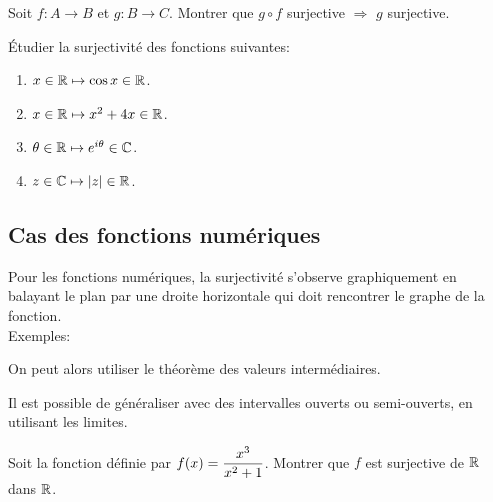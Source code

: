 \documentclass[a4paper, 11pt]{article}
\begin{document}
\begin{exercice}
	Soit $f: A\rightarrow B$ et $g: B\rightarrow C$. Montrer que $g\circ f$ surjective $\Rightarrow$ $g$ surjective.
\end{exercice}

\begin{exercice}
	\'Etudier la surjectivit\'e des fonctions suivantes:
	\begin{enumerate}

		\item $x\in\mathbb{R}\mapsto \cos x \in\mathbb{R}$.
		\item $x\in\mathbb{R}\mapsto x^2+4x\in\mathbb{R}$.


		\item $\theta\in\mathbb{R}\mapsto e^{i\theta}\in\mathbb{C}$.
		\item $z\in\mathbb{C}\mapsto |z|\in\mathbb{R}$.

	\end{enumerate}
\end{exercice}



\subsection{Cas des fonctions num\'eriques}

\begin{rem}
	Pour les fonctions num\'eriques, la surjectivit\'e s'observe graphiquement en balayant le plan par une droite horizontale qui doit rencontrer \dotfill le graphe de la fonction.\\
	\noindent Exemples:%



\end{rem}


\noindent On peut alors utiliser le th\'eor\`eme des valeurs interm\'ediaires.\\

\vsec

\noindent Il est possible de g\'en\'eraliser avec des intervalles ouverts ou semi-ouverts, en utilisant les limites.

	{\footnotesize
		\begin{exercice}
			Soit la fonction d\'efinie par $f(x)=\displaystyle\frac{x^3}{x^2+1}$. Montrer que $f$ est surjective de $\mathbb{R}$ dans $\mathbb{R}$.
		\end{exercice}}
\end{document}
